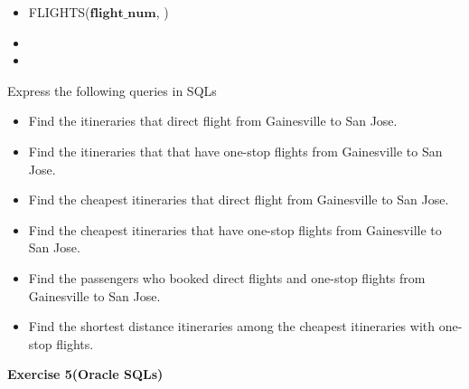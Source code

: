 \documentclass[12pt]{article}
\begin{document}
\begin{itemize}
\item 
FLIGHTS($\textbf{flight\_num}$, )
\item
{}
\item 
{}
\end{itemize}

Express the following queries in SQLs
\begin{itemize}
\item
Find the itineraries that direct flight from Gainesville to San Jose.

\item 
Find the itineraries that that have one-stop flights from Gainesville to San Jose.

\item
Find the cheapest itineraries that direct flight from Gainesville to San Jose.

\item 
Find the cheapest itineraries that have one-stop flights from Gainesville to San Jose.

\item
Find the passengers who booked direct flights and one-stop flights from Gainesville to San Jose.

\item
Find the shortest distance itineraries among the cheapest itineraries with one-stop flights.

\end{itemize}

\newpage
\textbf{Exercise 5(Oracle SQLs)}\\
\end{document}
